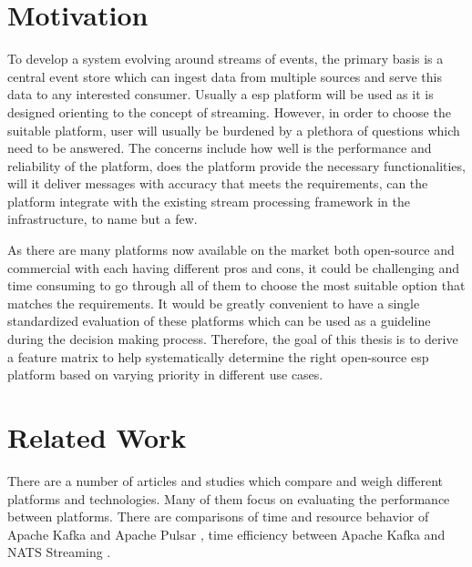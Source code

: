 \section{Motivation}
To develop a system evolving around streams of events, the primary basis is a central event store which can ingest data from multiple sources and serve this data to any interested consumer. Usually a \acrlong{esp} platform will be used as it is designed orienting to the concept of streaming. However, in order to choose the suitable platform, user will usually be burdened by a plethora of questions which need to be answered. The concerns include how well is the performance and reliability of the platform, does the platform provide the necessary functionalities, will it deliver messages with accuracy that meets the requirements, can the platform integrate with the existing stream processing framework in the infrastructure, to name but a few.

As there are many platforms now available on the market both open-source and commercial with each having different pros and cons, it could be challenging and time consuming to go through all of them to choose the most suitable option that matches the requirements. It would be greatly convenient to have a single standardized evaluation of these platforms which can be used as a guideline during the decision making process. Therefore, the goal of this thesis is to derive a feature matrix to help systematically determine the right open-source \acrlong{esp} platform based on varying priority in different use cases. 


\section{Related Work}
There are a number of articles and studies which compare and weigh different platforms and technologies. Many of them focus on evaluating the performance between platforms. There are comparisons of time and resource behavior of Apache Kafka and Apache Pulsar \cite{intorruk2019comparative} \cite{benchmarkkafkapulsar}, time efficiency between Apache Kafka and NATS Streaming \cite{benchmarknatskafka}.

